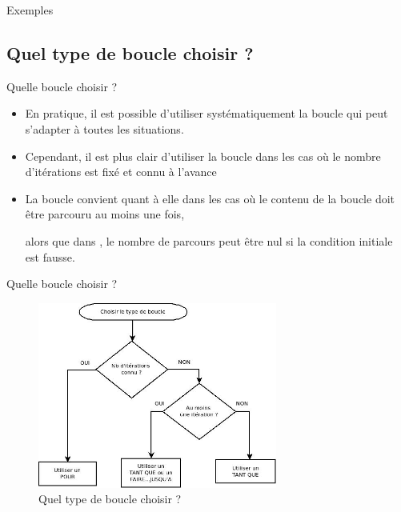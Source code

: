 \begin{frame}{Exemples~}
\end{frame}	

\subsection{Quel type de boucle choisir ?}

\begin{frame}{Quelle boucle choisir ?}
	\begin{itemize}
		\item
		En pratique, il est possible d’utiliser systématiquement la boucle 
		 qui peut s’adapter à toutes les situations. 
		\item
		Cependant, il est plus clair d’utiliser la boucle  
		dans les cas où le nombre d’itérations est fixé et connu à l’avance 
		\item
		La boucle  convient quant à elle
		dans les cas où le contenu de la boucle doit être parcouru au moins une
		fois, 
		
		alors que dans , 
		le nombre de parcours peut être nul si la condition initiale est fausse. 
	\end{itemize}
\end{frame}

\begin{frame}{Quelle boucle choisir ?}
	\begin{figure}[h]
	\centering
	\includegraphics[width=0.7\textwidth]{image/boucle-choixtype}
	\caption{Quel type de boucle choisir ?}
	\label{fig:boucle-choix}
	\end{figure}
\end{frame}
	
